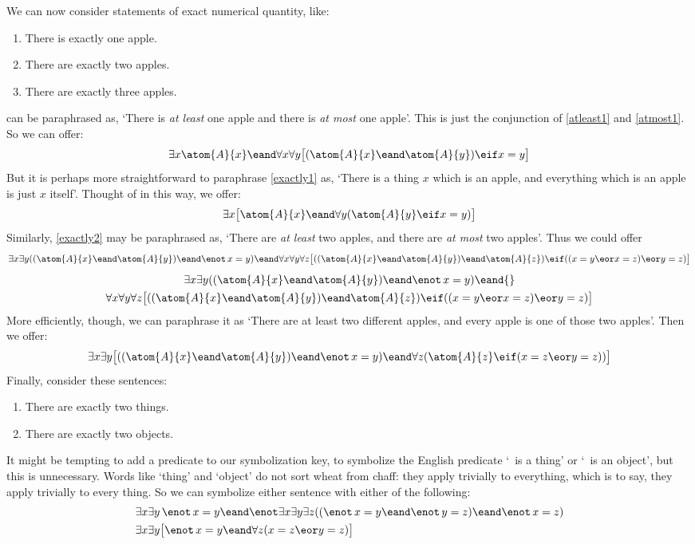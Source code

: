 We can now consider statements of exact numerical quantity, like:
\begin{enumerate}
\item\label{exactly1} There is exactly one apple.
\item\label{exactly2} There are exactly two apples.
\item\label{exactly3} There are exactly three apples.
\end{enumerate}
 can be paraphrased as, `There is \emph{at least} one
apple and there is \emph{at most} one apple'. This is just the
conjunction of \cref{atleast1} and \cref{atmost1}. So we can offer:
\[
	\exists x \atom{A}{x} \eand \forall x\forall y\bigl[(\atom{A}{x} \eand \atom{A}{y}) \eif x=y\bigr]
\]
But it is perhaps more straightforward to paraphrase \cref*{exactly1}
as, `There is a thing $x$ which is an apple, and everything which is
an apple is just $x$ itself'. Thought of in this way, we offer: 
\[
	\exists x\bigl[\atom{A}{x} \eand \forall y(\atom{A}{y} \eif x= y)\bigr]
\]
Similarly, \cref*{exactly2} may be paraphrased as, `There are \emph{at
least} two apples, and there are \emph{at most} two apples'. Thus we
could offer
\ifHTMLtarget
\[\exists x \exists y((\atom{A}{x} \eand \atom{A}{y}) \eand \enot\, {x = y}) \eand 
\forall x\forall y\forall z\bigl[((\atom{A}{x} \eand \atom{A}{y})
\eand \atom{A}{z}) \eif ((x=y \eor x=z) \eor y=z)\bigr]
\]
\else
\begin{multline*}
  \exists x \exists y((\atom{A}{x} \eand \atom{A}{y}) \eand \enot\, {x = y}) \eand {}\\
  \forall x\forall y\forall z\bigl[((\atom{A}{x} \eand \atom{A}{y}) \eand \atom{A}{z}) \eif ((x=y \eor x=z) \eor y=z)\bigr]
\end{multline*}
\fi
More efficiently, though, we can paraphrase it as `There are at least two different apples, and every apple is one of those two apples'. Then we offer:
$$\exists x\exists y\bigl[((\atom{A}{x} \eand \atom{A}{y}) \eand \enot\, {x = y}) \eand \forall z(\atom{A}{z} \eif ( x= z \eor y = z))\bigr]$$
Finally, consider these sentences:
\begin{enumerate}
\item\label{exactly2things} There are exactly two things.
\item\label{exactly2objects} There are exactly two objects.
\end{enumerate}
It might be tempting to add a predicate to our symbolization key, to symbolize the English predicate `\blank\ is a thing' or `\blank\ is an object', but this is unnecessary. Words like `thing' and `object' do not sort wheat from chaff: they apply trivially to everything, which is to say, they apply trivially to every thing. So we can symbolize either sentence with either of the following:
\begin{align*}
	& \exists x \exists y\,\enot\, {x = y} \eand  \enot \exists x \exists y \exists z ((\enot\, {x = y} \eand \enot\, {y = z}) \eand \enot\, {x = z}) \\
	& \exists x \exists y \bigl[\enot\, {x = y} \eand \forall z(x=z \eor y = z)\bigr]
\end{align*}

